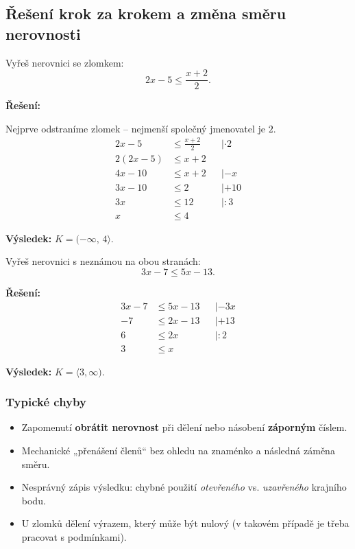 \documentclass[12pt,a4paper]{article}
\begin{document}
\subsection*{Řešení krok za krokem a změna směru nerovnosti}
\begin{examplebox}
Vyřeš nerovnici se zlomkem:
\[
2x - 5 \le \frac{x + 2}{2}.
\]

\textbf{Řešení:}

Nejprve odstraníme zlomek – nejmenší společný jmenovatel je $2$.
\begin{align*}
2x - 5 &\le \frac{x + 2}{2} &&| \cdot 2\\
2(2x - 5) &\le x + 2\\
4x - 10 &\le x + 2 &&| -x\\
3x - 10 &\le 2 &&| +10\\
3x &\le 12 &&| :3\\
x &\le 4
\end{align*}

\noindent
\textbf{Výsledek:} $K = (-\infty,\,4\rangle$.
\end{examplebox}

\begin{examplebox}
Vyřeš nerovnici s neznámou na obou stranách:
\[
3x - 7 \le 5x - 13.
\]

\textbf{Řešení:}
\begin{align*}
3x - 7 &\le 5x - 13 &&| -3x\\
-7 &\le 2x - 13 &&| +13\\
6 &\le 2x &&| :2\\
3 &\le x
\end{align*}

\noindent
\textbf{Výsledek:} $K = \langle3,\infty)$.
\end{examplebox}

\subsubsection*{Typické chyby}
\begin{itemize}
  \item Zapomenutí \textbf{obrátit nerovnost} při dělení nebo násobení \textbf{záporným} číslem.
  \item Mechanické „přenášení členů“ bez ohledu na znaménko a následná záměna směru.
  \item Nesprávný zápis výsledku: chybné použití \emph{otevřeného} vs. \emph{uzavřeného} krajního bodu.
  \item U zlomků dělení výrazem, který může být nulový (v takovém případě je třeba pracovat s podmínkami).
\end{itemize}
\end{document}

